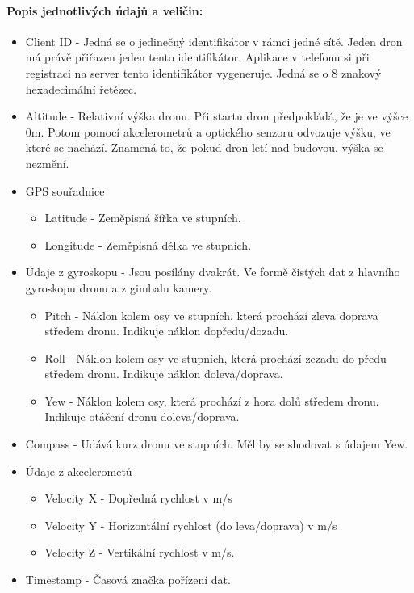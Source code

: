 \paragraph{\textnormal{Popis jednotlivých údajů a veličin:}}
\begin{itemize}
    \item Client ID - Jedná se o jedinečný identifikátor v rámci jedné sítě. Jeden dron má právě přiřazen jeden tento identifikátor. Aplikace v telefonu si při registraci na server tento identifikátor vygeneruje. Jedná se o 8 znakový hexadecimální řetězec.
    \item  Altitude - Relativní výška dronu. Při startu dron předpokládá, že je ve výšce 0m. Potom pomocí akcelerometrů a optického senzoru odvozuje výšku, ve které se nachází. Znamená to, že pokud dron letí nad budovou, výška se nezmění.
    \item GPS souřadnice
    \begin{itemize}
        \item Latitude - Zeměpisná šířka ve stupních.
        \item Longitude - Zeměpisná délka ve stupních.
    \end{itemize}

    \item Údaje z gyroskopu - Jsou posílány dvakrát. Ve formě čistých dat z hlavního gyroskopu dronu a z gimbalu kamery. 
    \begin{itemize}
        \item Pitch - Náklon kolem osy  ve stupních, která prochází zleva doprava středem dronu. Indikuje náklon dopředu/dozadu.
        \item Roll -  Náklon kolem osy  ve stupních, která prochází zezadu do předu středem dronu. Indikuje náklon doleva/doprava.
        \item Yew - Náklon kolem osy, která prochází z hora dolů  středem dronu. Indikuje otáčení dronu doleva/doprava.
    \end{itemize}
    \item Compass - Udává kurz dronu ve stupních. Měl by se shodovat s údajem Yew.
    \item Údaje z akcelerometů
    \begin{itemize}
        \item Velocity X - Dopředná rychlost v m/s
        \item Velocity Y - Horizontální rychlost (do leva/doprava) v m/s
        \item Velocity Z - Vertikální rychlost v m/s.
     \end{itemize}
     \item Timestamp - Časová značka pořízení dat.
\end{itemize}

